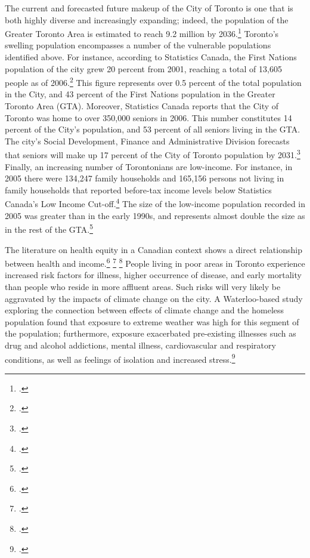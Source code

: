 The current and forecasted future makeup of the City of Toronto is one that is both highly diverse and increasingly expanding; indeed, the population of the Greater Toronto Area is estimated to reach 9.2 million by 2036.\footcite[][]{DemoProjections2012}
Toronto's swelling population encompasses a number of the vulnerable populations identified above. 
For instance, according to Statistics Canada, the First Nations population of the city grew 20 percent from 2001, reaching a total of 13,605 people as of 2006.\footcite[][]{2006TorontoProfile}
This figure represents over 0.5 percent of the total population in the City, and 43 percent of the First Nations population in the Greater Toronto Area (GTA). 
Moreover, Statistics Canada reports that the City of Toronto was home to over 350,000 seniors in 2006.
This number constitutes 14 percent of the City’s population, and 53 percent of all seniors living in the GTA. 
The city's Social Development, Finance and Administrative Division forecasts that seniors will make up 17 percent of the City of Toronto population by 2031.\footcite[][p. 5]{SeniorsDemographicSnapshot}
Finally, an increasing number of Torontonians are low-income.
For instance, in 2005 there were 134,247 family households and 165,156 persons not living in family households that reported before-tax income levels below Statistics Canada's Low Income Cut-off.\footcite[][p. 5]{LowIncomeProfile}
The size of the low-income population recorded in 2005 was greater than in the early 1990s, and represents almost double the size as in the rest of the GTA.\footcite[][p. 6]{LowIncomeProfile}



The literature on health equity in a Canadian context shows a direct relationship between health and income.\footcite[][]{HotWeatherResponse2006} \footcite[][]{PovertyMakingSick} \footcite[][]{PovertyInequalityHealth}
People living in poor areas in Toronto experience increased risk factors for illness, higher occurrence of disease, and early mortality than people who reside in more affluent areas.
Such risks will very likely be aggravated by the impacts of climate change on the city.
A Waterloo-based study exploring the connection between effects of climate change and the homeless population found that exposure to extreme weather was high for this segment of the population; furthermore, exposure exacerbated pre-existing illnesses such as drug and alcohol addictions, mental illness, cardiovascular and respiratory conditions, as well as feelings of isolation and increased stress.\footcite[][]{HomelessnessWaterloo}



